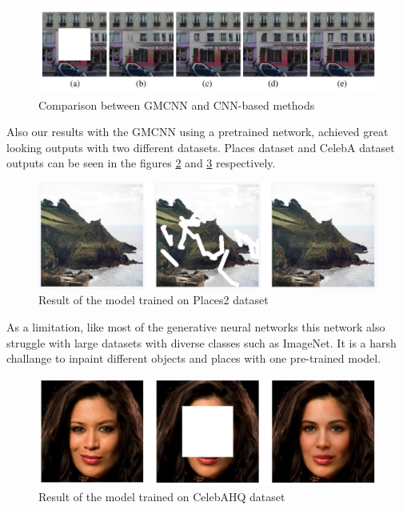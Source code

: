 \begin{figure}[h]
    \centering
    \includegraphics[width=14cm]{figures/chapter4/gmcnn_paris_comparison.png}
    \caption{Comparison between GMCNN and CNN-based methods \cite{inpainting_via_multi_cnn}}
    \label{fig:gmcnn_paris_comparison}
\end{figure}

Also our results with the GMCNN using a pretrained network, achieved great looking outputs with two different datasets. Places \cite{dataset_places} dataset and CelebA \cite{celebA} dataset outputs can be seen in the figures \ref{fig:gmcnn_places2} and \ref{fig:gmcnn_celebA} respectively.

\begin{figure}[h]
    \centering
    \includegraphics[width=12cm]{figures/chapter4/gmcnnout2.png}
    \caption{Result of the model trained on Places2 dataset}
    \label{fig:gmcnn_places2}
\end{figure}

As a limitation, like most of the generative neural networks this network also struggle with large datasets with diverse classes such as ImageNet. It is a harsh challange to inpaint different objects and places with one pre-trained model.

\begin{figure}[h]
    \centering
    \includegraphics[width=12cm]{figures/chapter4/gmcnnout1.png}
    \caption{Result of the model trained on CelebAHQ dataset}
    \label{fig:gmcnn_celebA}
\end{figure}

